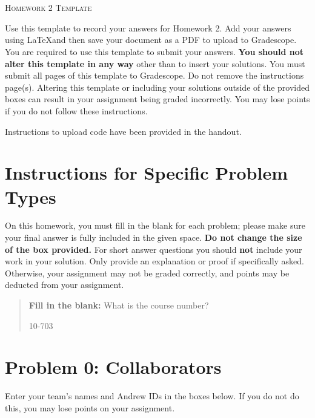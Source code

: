 \documentclass[12pt]{article}
\begin{document}
\section*{}
\begin{center}
  \centerline{\textsc{\LARGE  Homework 2 Template}}
\end{center}

Use this template to record your answers for Homework 2.  Add your answers using \LaTeX and then save your document as a PDF to upload to Gradescope.  You are required to use this template to submit your answers.  \textbf{You should not alter this template in any way} other than to insert your solutions.  You must submit all \pageref{LastPage} pages of this template to Gradescope.  Do not remove the instructions page(s).  Altering this template or including your solutions outside of the provided boxes can result in your assignment being graded incorrectly.  You may lose points if you do not follow these instructions.

Instructions to upload code have been provided in the handout.

\section*{Instructions for Specific Problem Types}

On this homework, you must fill in the blank for each problem; please make sure your final answer is fully included in the given space.  \textbf{Do not change the size of the box provided.}  For short answer questions you should \textbf{not} include your work in your solution.  Only provide an explanation or proof if specifically asked.  Otherwise, your assignment may not be graded correctly, and points may be deducted from your assignment.

\begin{quote}
\textbf{Fill in the blank:} What is the course number?

\begin{tcolorbox}[fit,height=1cm, width=4cm, blank, borderline={1pt}{-2pt},valign=center,nobeforeafter]
    \begin{center}\huge10-703\end{center}
    \end{tcolorbox}
\end{quote}

\newpage

\section*{Problem 0: Collaborators}
Enter your team's names and Andrew IDs in the boxes below.  If you do not do this, you may lose points on your assignment.
\end{document}

